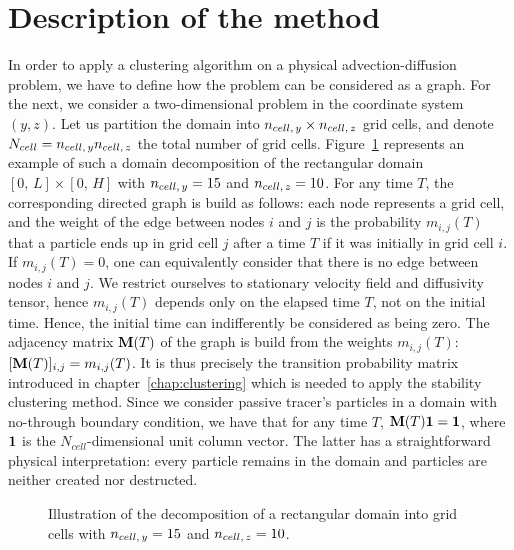 \section{Description of the method}
In order to apply a clustering algorithm on a physical advection-diffusion problem, we have to define how the problem can be considered as a graph. For the next, we consider a two-dimensional problem in the coordinate system $(y,z)$. Let us partition the domain into $n_{cell,\,y} \times n_{cell,\,z}$ grid cells, and denote $N_{cell} = n_{cell,\,y}n_{cell,\,z}$ the total number of grid cells. Figure~\ref{fig:box_scheme} represents an example of such a domain decomposition of the rectangular domain $[0,\,L]\times[0,\,H]$ with $n_{cell,\,y} = 15$ and $n_{cell,\,z} = 10$. For any time $T$, the corresponding directed graph is build as follows: each node represents a grid cell, and the weight of the edge between nodes $i$ and $j$ is the probability $m_{i,j}(T)$ that a particle ends up in grid cell $j$ after a time $T$ if it was initially in grid cell $i$. If $m_{i,j}(T) = 0$, one can equivalently consider that there is no edge between nodes $i$ and $j$. We restrict ourselves to stationary velocity field and diffusivity tensor, hence $m_{i,j}(T)$ depends only on the elapsed time $T$, not on the initial time. Hence, the initial time can indifferently be considered as being zero. The adjacency matrix $\mathbf M(T)$ of the graph is build from the weights $m_{i,j}(T)$: $[\mathbf M(T)]_{i,j} = m_{i,j}(T)$. It is thus precisely the transition probability matrix introduced in chapter~\ref{chap:clustering} which is needed to apply the stability clustering method. Since we consider passive tracer's particles in a domain with no-through boundary condition, we have that for any time $T$, $\mathbf M(T)\mathbf 1 = \mathbf 1$, where $\mathbf 1$ is the $N_{cell}$-dimensional unit column vector. The latter has a straightforward physical interpretation: every particle remains in the domain and particles are neither created nor destructed.

\begin{figure}[!htp]
	\centering
	
	\caption{Illustration of the decomposition of a rectangular domain into grid cells with $n_{cell,\,y} = 15$ and $n_{cell,\,z} = 10$.}
	\label{fig:box_scheme}
\end{figure}

